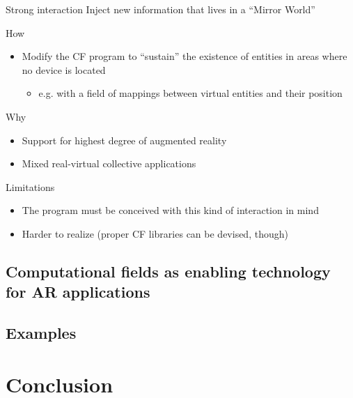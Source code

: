 \documentclass[presentation]{beamer} %
\begin{document}
\begin{frame}{Strong interaction}
  Inject new information that lives in a ``Mirror World''
  \begin{block} {How}
   \begin{itemize}
    \item Modify the CF program to ``sustain'' the existence of entities in areas where no device is located
    \begin{itemize}
      \item e.g. with a field of mappings between virtual entities and their position
    \end{itemize}
   \end{itemize}
  \end{block}
  \begin{block} {Why}
   \begin{itemize}
    \item Support for highest degree of augmented reality
    \item Mixed real-virtual collective applications
   \end{itemize}
  \end{block}
  \begin{block} {Limitations}
   \begin{itemize}
    \item The program must be conceived with this kind of interaction in mind
    \item Harder to realize (proper CF libraries can be devised, though)
   \end{itemize}
  \end{block}
\end{frame}


\subsection{Computational fields as enabling technology for AR applications}
\subsection{Examples}
\section{Conclusion}
\end{document}
